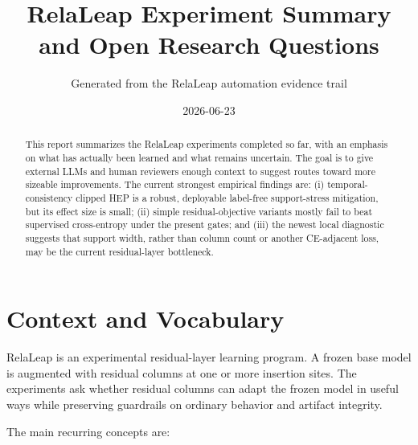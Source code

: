 \documentclass[11pt]{article}
\title{RelaLeap Experiment Summary and Open Research Questions}
\author{Generated from the RelaLeap automation evidence trail}
\date{2026-06-23}
\begin{document}
\maketitle

\begin{abstract}
This report summarizes the RelaLeap experiments completed so far, with an
emphasis on what has actually been learned and what remains uncertain. The
goal is to give external LLMs and human reviewers enough context to suggest
routes toward more sizeable improvements. The current strongest empirical
findings are: (i) temporal-consistency clipped HEP is a robust, deployable
label-free support-stress mitigation, but its effect size is small; (ii)
simple residual-objective variants mostly fail to beat supervised cross-entropy
under the present gates; and (iii) the newest local diagnostic suggests that
support width, rather than column count or another CE-adjacent loss, may be the
current residual-layer bottleneck.
\end{abstract}

\section{Context and Vocabulary}

RelaLeap is an experimental residual-layer learning program. A frozen base
model is augmented with residual columns at one or more insertion sites. The
experiments ask whether residual columns can adapt the frozen model in useful
ways while preserving guardrails on ordinary behavior and artifact integrity.

The main recurring concepts are:
\end{document}
